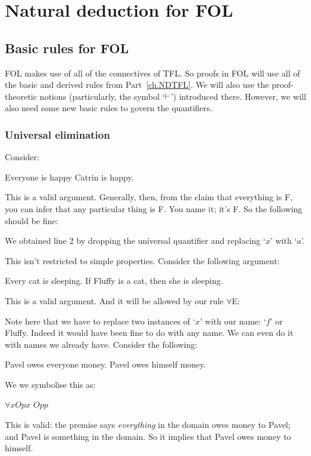 \part{Natural deduction for FOL}
\label{ch.NDFOL}


\chapter{Basic rules for FOL}\label{s:BasicFOL}

FOL makes use of all of the connectives of TFL. So proofs in FOL will use all of the basic and derived rules from Part~\ref{ch.NDTFL}. We will also use the proof-theoretic notions (particularly, the symbol `$\vdash$') introduced there. However, we will also need some new basic rules to govern the quantifiers.


\section{Universal elimination}Consider:
\begin{earg}
\prem Everyone is happy
\conc Catrin is happy.
\end{earg} This is a valid argument. Generally, then, from the claim that everything is F, you can infer that any particular thing is F. You name it; it's F. So the following should be fine:
\begin{fitchproof}
	 
\end{fitchproof}
We obtained line 2 by dropping the universal quantifier and replacing `$x$' with `$a$'.

This isn't restricted to simple properties. Consider the following argument:
\begin{earg}
\prem Every cat is sleeping.
\conc If Fluffy is a cat, then she is sleeping.
\end{earg}
This is a valid argument. And it will be allowed by our rule $\forall$E:
\begin{fitchproof}
	 
\end{fitchproof}
Note here that we have to replace two instances of `$x$' with our name: `$f$' or Fluffy. Indeed it would have been fine to do with any name. We can even do it with names we already have. Consider the following:
\begin{earg}
\prem Pavel owes everyone money.
\conc Pavel owes himself money.
\end{earg}
We we symbolise this as:
\begin{earg}
\prem $\forall x Opx$
\conc $Opp$
\end{earg}
This is valid: the premise says \emph{everything} in the domain owes money to Pavel; and Pavel is something in the domain. So it implies that Pavel owes money to himself.

